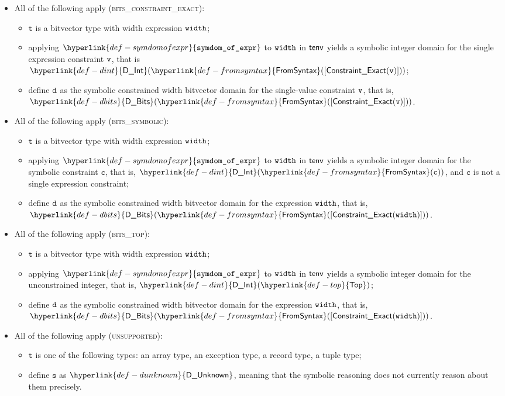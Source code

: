 \documentclass{book}
\newcommand\DInt[0]{\hyperlink{def-dint}{\textsf{D\_Int}}}
\newcommand\DBits[0]{\hyperlink{def-dbits}{\textsf{D\_Bits}}}
\newcommand\DUnknown[0]{\hyperlink{def-dunknown}{\textsf{D\_Unknown}}}
\newcommand\Top[0]{\hyperlink{def-top}{\textsf{Top}}}
\newcommand\FromSyntax[0]{\hyperlink{def-fromsymtax}{\textsf{FromSyntax}}}
\newcommand\symdomofexpr[0]{\hyperlink{def-symdomofexpr}{\texttt{symdom\_of\_expr}}}
\newcommand\vc[0]{\texttt{c}}
\newcommand\vt[0]{\texttt{t}}
\newcommand\vs[0]{\texttt{s}}
\begin{document}
\begin{itemize}
  \item All of the following apply (\textsc{bits\_constraint\_exact}):
  \begin{itemize}
    \item $\vt$ is a bitvector type with width expression $\texttt{width}$;
    \item applying $\symdomofexpr$ to $\texttt{width}$ in $\textsf{tenv}$ yields a symbolic integer domain for the single expression constraint $\texttt{v}$,
          that is \\
          $\DInt(\FromSyntax([\ConstraintExact(\vv)]))$;
    \item define $\texttt{d}$ as the symbolic constrained width bitvector domain for the single-value constraint $\texttt{v}$, that is,
          $\DBits(\FromSyntax([\ConstraintExact(\vv)]))$.
  \end{itemize}

  \item All of the following apply (\textsc{bits\_symbolic}):
  \begin{itemize}
    \item $\vt$ is a bitvector type with width expression $\texttt{width}$;
    \item applying $\symdomofexpr$ to $\texttt{width}$ in $\textsf{tenv}$ yields a symbolic integer domain for the symbolic constraint $\vc$,
          that is, $\DInt(\FromSyntax(\vc))$, and $\vc$ is not a single expression constraint;
    \item define $\texttt{d}$ as the symbolic constrained width bitvector domain for the expression $\texttt{width}$, that is,
          $\DBits(\FromSyntax([\ConstraintExact(\width)]))$.
  \end{itemize}

  \item All of the following apply (\textsc{bits\_top}):
  \begin{itemize}
    \item $\vt$ is a bitvector type with width expression $\texttt{width}$;
    \item applying $\symdomofexpr$ to $\texttt{width}$ in $\textsf{tenv}$ yields a symbolic integer domain for the unconstrained integer,
          that is, $\DInt(\Top)$;
    \item define $\texttt{d}$ as the symbolic constrained width bitvector domain for the expression $\texttt{width}$, that is,
          $\DBits(\FromSyntax([\ConstraintExact(\width)]))$.
  \end{itemize}

  \item All of the following apply (\textsc{unsupported}):
  \begin{itemize}
    \item $\vt$ is one of the following types: an array type, an exception type, a record type, a tuple type;
    \item define $\vs$ as $\DUnknown$, meaning that the symbolic reasoning does not currently reason about them precisely.
  \end{itemize}


\end{itemize}
\end{document}
